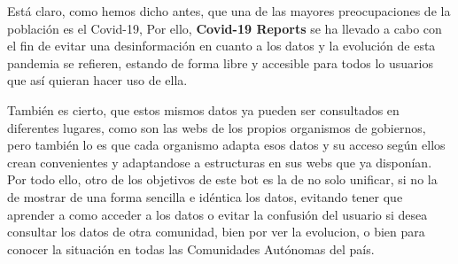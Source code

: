 Está claro, como hemos dicho antes, que una de las mayores preocupaciones de la población es el Covid-19, Por ello, \textbf{Covid-19 Reports} se ha llevado a cabo con el fin de evitar una desinformación en cuanto a los datos y la evolución de esta pandemia se refieren, estando de forma libre y accesible para todos lo usuarios que así quieran hacer uso de ella.

También es cierto, que estos mismos datos ya pueden ser consultados en diferentes lugares, como son las webs de los propios organismos de gobiernos, pero también lo es que cada organismo adapta esos datos y su acceso según ellos crean convenientes y adaptandose a estructuras en sus webs que ya disponían. Por todo ello, otro de los objetivos de este bot es la de no solo unificar, si no la de mostrar de una forma sencilla e idéntica los datos, evitando tener que aprender a como acceder a los datos o evitar la confusión del usuario si desea consultar los datos de otra comunidad, bien por ver la evolucion, o bien para conocer la situación en todas las Comunidades Autónomas del país.
